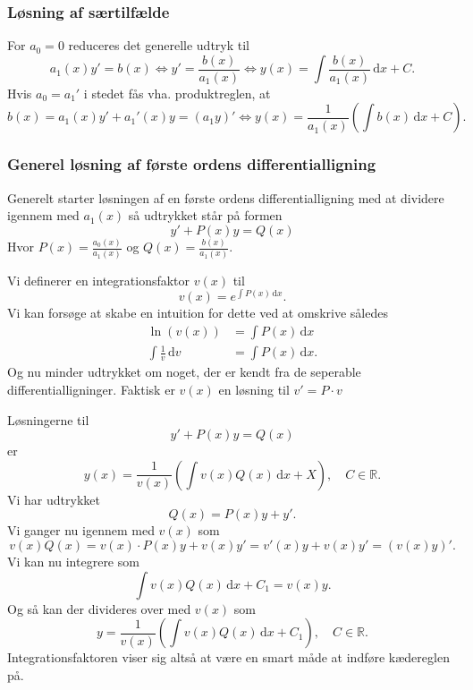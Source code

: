 \subsubsection{Løsning af særtilfælde}
For $a_0 = 0$ reduceres det generelle udtryk til
\[ 
a_1(x)y' = b(x) \iff y' = \frac{b(x)}{a_1(x)} \iff y(x) = \int \frac{b(x)}{a_1(x)} \, \mathrm{d}x + C
.\]
Hvis $a_0 = a_1'$ i stedet fås vha. produktreglen, at
\[ 
b(x) = a_1(x)y' + a_1'(x)y = (a_1y)' \iff y(x) = \frac{1}{a_1(x)} \left( \int b(x) \, \mathrm{d}x + C \right)
.\]

\subsubsection{Generel løsning af første ordens differentialligning}
Generelt starter løsningen af en første ordens differentialligning med at dividere igennem med $a_1(x)$ så udtrykket står på formen
\[ 
y' + P(x)y = Q(x)
\]
Hvor $P (x) = \frac{a_0(x)}{a_1(x)}$ og $Q(x) = \frac{b(x)}{a_1(x)}$.

\begin{definition} [Integrationsfaktor]
  Vi definerer en integrationsfaktor $v(x)$ til
  \[ 
  v(x) = e^{\int P(x) \, \mathrm{d}x }
  .\]
  \bigbreak
  Vi kan forsøge at skabe en intuition for dette ved at omskrive således
  \begin{align*}
    \ln(v(x)) &= \int P(x) \, \mathrm{d}x \\
    \int \frac{1}{v} \, \mathrm{d}v &= \int P(x) \, \mathrm{d}x 
  .\end{align*}
  Og nu minder udtrykket om noget, der er kendt fra de seperable differentialligninger. Faktisk er $v(x)$ en løsning til $v' = P \cdot v$
\end{definition}

\begin{sæt} 
  Løsningerne til 
  \[ 
  y' + P(x)y = Q(x)
  \]
  er
  \[ 
  y(x) = \frac{1}{v(x)} \left( \int v(x)Q(x)\, \mathrm{d}x + X \right), \quad C \in \mathbb{R}
  .\]
  \tcblower
  Vi har udtrykket
  \[ 
  Q(x) = P(x)y + y'
  .\]
  Vi ganger nu igennem med $v(x)$ som
  \[ 
  v(x)Q(x) = v(x)\cdot P(x) y + v(x)y' = v'(x)y + v(x)y' = (v(x)y)'
  .\]
  Vi kan nu integrere som
  \[ 
  \int v(x)Q(x) \, \mathrm{d}x + C_1 = v(x)y
  .\]
  Og så kan der divideres over med $v(x)$ som
  \[ 
  y = \frac{1}{v(x)} \left( \int v(x)Q(x) \, \mathrm{d}x + C_1 \right), \quad C \in \mathbb{R}
  .\]
  Integrationsfaktoren viser sig altså at være en smart måde at indføre kædereglen på.
\end{sæt}

